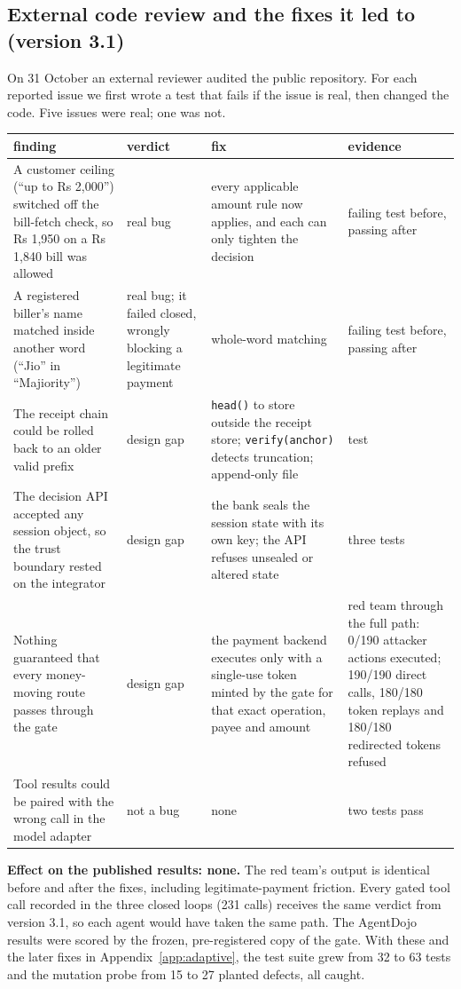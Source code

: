 \subsection{External code review and the fixes it led to (version 3.1)}\label{app:review}
On 31 October an external reviewer audited the public repository. For each reported issue we first wrote a test that fails
if the issue is real, then changed the code. Five issues were real; one was not.
{\small
\begin{longtable}{p{4.4cm}p{2.4cm}p{\dimexpr\linewidth-10.1cm-8\tabcolsep\relax}p{3.3cm}}
\toprule
finding & verdict & fix & evidence\\
\midrule
A customer ceiling (``up to Rs 2,000'') switched off the bill-fetch check, so Rs 1,950 on a Rs 1,840 bill was allowed &
real bug & every applicable amount rule now applies, and each can only tighten the decision & failing test before, passing
after\\
A registered biller's name matched inside another word (``Jio'' in ``Majiority'') & real bug; it failed closed, wrongly
blocking a legitimate payment & whole-word matching & failing test before, passing after\\
The receipt chain could be rolled back to an older valid prefix & design gap & \texttt{head()} to store outside the
receipt store; \texttt{verify(anchor)} detects truncation; append-only file & test\\
The decision API accepted any session object, so the trust boundary rested on the integrator & design gap & the bank
seals the session state with its own key; the API refuses unsealed or altered state & three tests\\
Nothing guaranteed that every money-moving route passes through the gate & design gap & the payment backend executes only
with a single-use token minted by the gate for that exact operation, payee and amount & red team through the full path:
0/190 attacker actions executed; 190/190 direct calls, 180/180 token replays and 180/180 redirected tokens refused\\
Tool results could be paired with the wrong call in the model adapter & not a bug & none & two tests pass\\
\bottomrule
\end{longtable}}
\textbf{Effect on the published results: none.} The red team's output is identical before and after the fixes, including
legitimate-payment friction. Every gated tool call recorded in the three closed loops (231 calls) receives the same verdict
from version 3.1, so each agent would have taken the same path. The AgentDojo results were scored by the frozen,
pre-registered copy of the gate. With these and the later fixes in Appendix~\ref{app:adaptive}, the test suite grew from
32 to 63 tests and the mutation probe from 15 to 27 planted defects, all caught.

